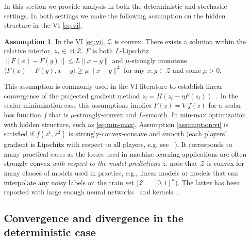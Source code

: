 \documentclass{article} %
\theoremstyle{definition}
\newtheorem{assumption}[theorem]{Assumption}
\newcommand{\ri}{\operatorname{ri}}
\newcommand{\inner}[2]{\langle #1, #2 \rangle}
\begin{document}
In this section we provide analysis in both the deterministic and stochastic settings.
In both settings we make the following assumption on the hidden structure in the VI \eqref{eq:vi}.
\begin{assumption}\label{assumption:vi}
    In the VI \eqref{eq:vi}, $\mathcal{Z}$ is convex. There exists a solution within the relative interior, $z_\ast \in \ri \mathcal{Z}$.
    $F$ is both $L$-Lipschitz $\|F(x)-F(y)\|\leq L \|x-y\|$ and $\mu$-strongly monotone $\inner{F(x)-F(y)}{x-y} \geq \mu \|x-y\|^2$ for any $x,y \in \mathcal{Z}$ and some $\mu > 0$.
\end{assumption}
This assumption is commonly used in the VI literature to establish linear convergence of the projected gradient method $z_t = \Pi(z_t- \eta F(z_t))$~\citep{facchinei2003finite}.
In the scalar minimization case this assumptions implies $F(z) = \nabla f(z)$ for a scalar loss function $f$ that is $\mu$-strongly-convex and $L$-smooth.
In min-max optimization with hidden structure, such as \eqref{eq:min-max}, Assumption \eqref{assumption:vi} is satisfied if $f(z^1, z^2)$ is strongly-convex-concave and smooth (each players' gradient is Lipschitz with respect to all players, e.g. see ~\citet{bubeck2015convex}). It corresponds to many practical cases as the losses used in machine learning applications are often strongly convex \emph{with respect to the model predictions $z$}. note that $\mathcal{Z}$ is convex for many classes of models used in practice, e.g., linear models or models that can interpolate any noisy labels on the train set ($\mathcal{Z}= [0,1]^n$). The latter has been reported with large enough neural networks~\citep{zhang2017understanding} and kernels~\citep{belkin2019does}.






\subsection{Convergence and divergence in the deterministic case}
\end{document}
